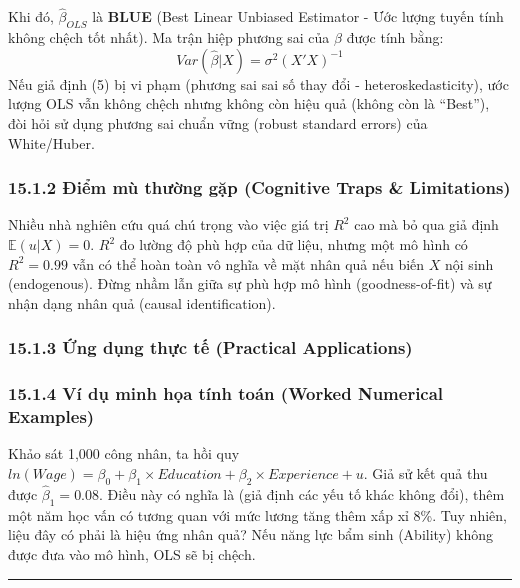 \documentclass[
]{article}
\begin{document}
Khi đó, \(\hat{\beta}_{OLS}\) là \textbf{BLUE} (Best Linear Unbiased
Estimator - Ước lượng tuyến tính không chệch tốt nhất). Ma trận hiệp
phương sai của \(\hat{\beta}\) được tính bằng:
\[ Var(\hat{\beta}|X) = \sigma^2 (X'X)^{-1} \] Nếu giả định (5) bị vi
phạm (phương sai sai số thay đổi - heteroskedasticity), ước lượng OLS
vẫn không chệch nhưng không còn hiệu quả (không còn là ``Best''), đòi
hỏi sử dụng phương sai chuẩn vững (robust standard errors) của
White/Huber.

\subsubsection{15.1.2 Điểm mù thường gặp (Cognitive Traps \&
Limitations)}\label{ux111iux1ec3m-muxf9-thux1b0ux1eddng-gux1eb7p-cognitive-traps-limitations-97}

Nhiều nhà nghiên cứu quá chú trọng vào việc giá trị \(R^2\) cao mà bỏ
qua giả định \(\mathbb{E}(u|X) = 0\). \(R^2\) đo lường độ phù hợp của dữ
liệu, nhưng một mô hình có \(R^2 = 0.99\) vẫn có thể hoàn toàn vô nghĩa
về mặt nhân quả nếu biến \(X\) nội sinh (endogenous). Đừng nhầm lẫn giữa
sự phù hợp mô hình (goodness-of-fit) và sự nhận dạng nhân quả (causal
identification).

\subsubsection{15.1.3 Ứng dụng thực tế (Practical
Applications)}\label{ux1ee9ng-dux1ee5ng-thux1ef1c-tux1ebf-practical-applications-53}

\subsubsection{15.1.4 Ví dụ minh họa tính toán (Worked Numerical
Examples)}\label{vuxed-dux1ee5-minh-hux1ecda-tuxednh-touxe1n-worked-numerical-examples-44}

Khảo sát 1,000 công nhân, ta hồi quy
\(ln(Wage) = \beta_0 + \beta_1 \times Education + \beta_2 \times Experience + u\).
Giả sử kết quả thu được \(\hat{\beta}_1 = 0.08\). Điều này có nghĩa là
(giả định các yếu tố khác không đổi), thêm một năm học vấn có tương quan
với mức lương tăng thêm xấp xỉ 8\%. Tuy nhiên, liệu đây có phải là hiệu
ứng nhân quả? Nếu năng lực bẩm sinh (Ability) không được đưa vào mô
hình, OLS sẽ bị chệch.

\begin{center}\rule{0.5\linewidth}{0.5pt}\end{center}
\end{document}
